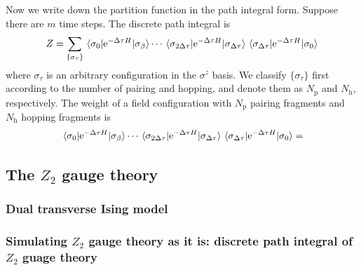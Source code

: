 \documentclass[hyperref, a4paper]{article}
\newcommand*{\ee}{\mathrm{e}}
\newcommand*{\Ztwo}{$\mathbb{Z}_2$ }
\def\mathbb#1{#1}%
\begin{document}
Now we write down the partition function in the path integral form.
Suppose there are $m$ time steps. The discrete path integral is 
\begin{equation}
    Z = \sum_{\{\sigma_\tau\}} \mel{\sigma_0}{\ee^{-\Delta \tau H}}{\sigma_\beta} \cdots \mel{\sigma_{2\Delta \tau}}{\ee^{-\Delta \tau H}}{\sigma_{\Delta \tau}} \mel{\sigma_{\Delta \tau}}{\ee^{-\Delta \tau H}}{\sigma_{0}}  
\end{equation}
where $\sigma_\tau$ is an arbitrary configuration in the $\sigma^z$ basis.
We classify $\{\sigma_\tau\}$ first according to the number of pairing and hopping, and denote them as $N_\text{p}$ and $N_\text{h}$, respectively.
The weight of a field configuration with $N_\text{p}$ pairing fragments and $N_\text{h}$ hopping fragments is
\[
    \mel{\sigma_0}{\ee^{-\Delta \tau H}}{\sigma_\beta} \cdots \mel{\sigma_{2\Delta \tau}}{\ee^{-\Delta \tau H}}{\sigma_{\Delta \tau}} \mel{\sigma_{\Delta \tau}}{\ee^{-\Delta \tau H}}{\sigma_{0}} = 
\]

\subsection{The \Ztwo gauge theory}

\subsubsection{Dual transverse Ising model}

\subsubsection{Simulating \Ztwo gauge theory as it is: discrete path integral of \Ztwo guage theory}
\end{document}
